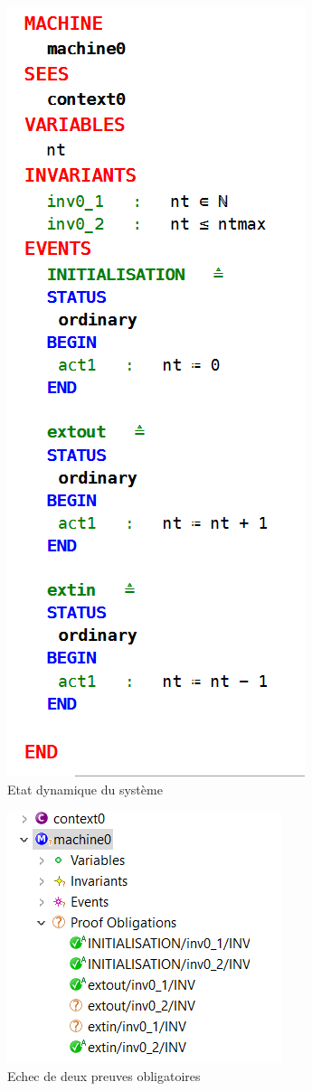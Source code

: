 \begin{figure}[H]
	\begin{center}	
		\includegraphics[scale=0.8]{images/mac0}
		\caption{Etat dynamique du système}
		\label{mac0}
	\end{center}
\end{figure}

\begin{figure}[H]
	\begin{center}	
		\includegraphics[scale=0.8]{images/proof1}
		\caption{Echec de deux preuves obligatoires}
		\label{mac0}
	\end{center}
\end{figure}

